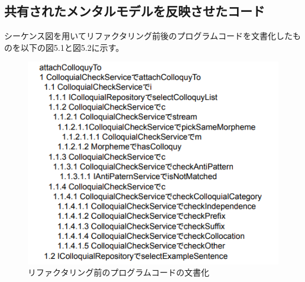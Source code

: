 \documentclass[12pt, a4paper]{jreport}
\begin{document}
\subsection{共有されたメンタルモデルを反映させたコード}
シーケンス図を用いてリファクタリング前後のプログラムコードを文書化したものを以下の図5.1と図5.2に示す。
\begin{figure}[H]
\centering
\includegraphics[width=1\linewidth]{image/modeiBe.png}
\caption{リファクタリング前のプログラムコードの文書化}
\label{fig:enter-label}
\end{figure}
\end{document}
